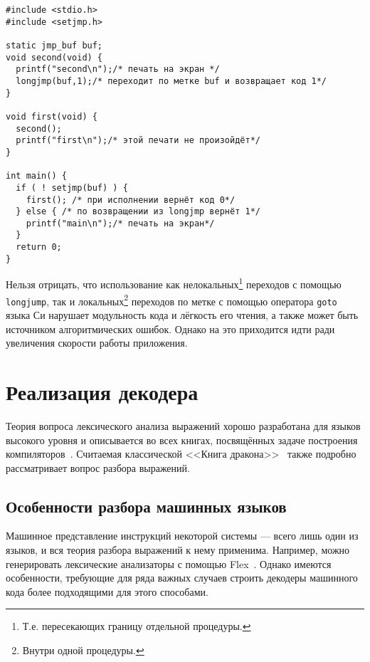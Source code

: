 \begin{lstlisting}
#include <stdio.h>
#include <setjmp.h>
 
static jmp_buf buf;
void second(void) {
  printf("second\n");/* печать на экран */
  longjmp(buf,1);/* переходит по метке buf и возвращает код 1*/
}
 
void first(void) {
  second();
  printf("first\n");/* этой печати не произойдёт*/
}
 
int main() {   
  if ( ! setjmp(buf) ) {
    first(); /* при исполнении вернёт код 0*/
  } else { /* по возвращении из longjmp вернёт 1*/
    printf("main\n");/* печать на экран*/
  }
  return 0;
}
\end{lstlisting}

Нельзя отрицать, что использование как нелокальных\footnote{Т.е. пересекающих границу отдельной процедуры.} переходов с помощью \texttt{longjump}, так и локальных\footnote{Внутри одной процедуры.} переходов по метке с помощью оператора \texttt{goto} языка Си нарушает модульность кода и лёгкость его чтения, а также может быть источником алгоритмических ошибок. Однако на это приходится идти ради увеличения скорости работы приложения.

\section{Реализация декодера}\label{sec:decoding}

Теория вопроса лексического анализа выражений хорошо разработана для языков высокого уровня и описывается во всех книгах, посвящённых задаче построения компиляторов~\cite{eac2011}. Считаемая классической <<Книга дракона>>~\cite{dragonbook} также подробно рассматривает вопрос разбора выражений.

\subsection{Особенности разбора машинных языков}

Машинное представление инструкций некоторой системы --- всего лишь один из языков, и вся теория разбора выражений к нему применима. Например, можно генерировать лексические анализаторы с помощью Flex~\cite{flex-manual}. Однако имеются особенности, требующие для ряда важных случаев строить декодеры машинного кода более подходящими для этого способами.

